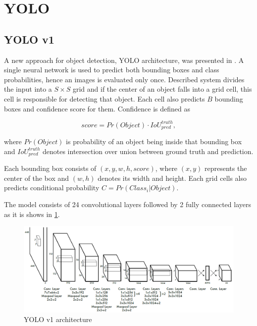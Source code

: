 \documentclass[twoside]{ctuthesis}
\theoremstyle{plain}
\theoremstyle{definition}
\theoremstyle{note}
\begin{document}
\section{YOLO}

\subsection{YOLO v1}
A new approach for object detection, YOLO architecture, was presented in \cite{redmon_divvala_girshick_farhadi_2016}. A single neural network is used to predict both bounding boxes and class probabilities, hence an images is evaluated only once. Described system divides the input into a $S \times S$ grid and if the center of an object falls into a grid cell, this cell is responsible for detecting that object. Each cell also predicts $B$ bounding boxes and confidence score for them. Confidence is defined as 

\begin{equation}
score = Pr(Object)\cdot IoU^{truth}_{pred},
\end{equation}


where $Pr(Object)$ is probability of an object being inside that bounding box and $IoU^{truth}_{pred}$ denotes intersection over union between ground truth and prediction. 

Each bounding box consists of $\left(x, y, w, h, score\right)$, where $\left(x, y\right)$ represents the center of the box and $\left(w, h\right)$ denotes its width and height. Each grid cells also predicts conditional probability $C = Pr(Class_i|Object)$.

The model consists of 24 convolutional layers followed by 2 fully connected layers as it is shows in \ref{yolov1}.

\begin{figure}[h]
\caption{YOLO v1 architecture}
\label{yolov1}
\includegraphics[width=\textwidth]{images/used_networks/yolov1.png}
\end{figure}
\end{document}
